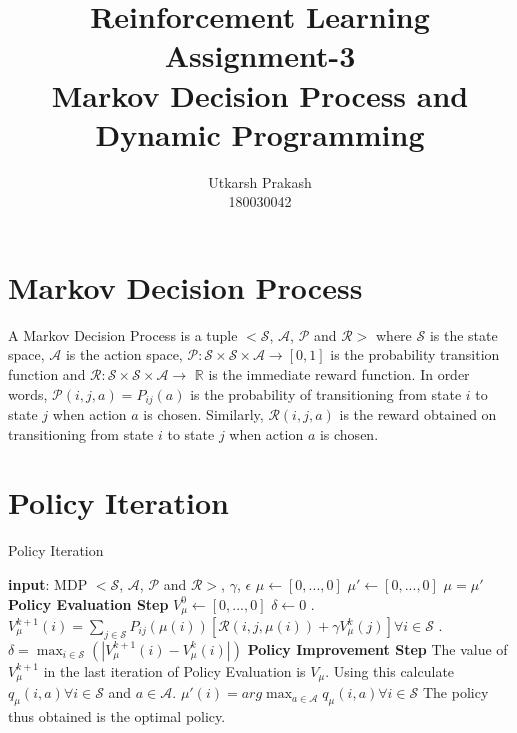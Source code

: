 \documentclass{article}
\title{Reinforcement Learning Assignment-3 \\
	\Large Markov Decision Process and Dynamic Programming \\}
\begin{document}
\author{Utkarsh Prakash \\ \normalsize 180030042}
\maketitle
\section{Markov Decision Process}
A Markov Decision Process is a tuple $<\mathcal{S}$, $\mathcal{A}$, $\mathcal{P}$ and $\mathcal{R}>$ where $\mathcal{S}$ is the state space,
$\mathcal{A}$ is the action space, $\mathcal{P} : \mathcal{S} \times \mathcal{S} \times \mathcal{A} \rightarrow [0, 1]$ is the probability transition
function and $\mathcal{R} : \mathcal{S} \times \mathcal{S} \times \mathcal{A} \rightarrow$ $\mathbb{R}$ is the immediate reward function.
In order words, $\mathcal{P}(i, j, a) = P_{ij}(a)$ is the probability of transitioning from state $i$ to state $j$ when action $a$ is chosen.
Similarly, $\mathcal{R}(i, j, a)$ is the reward obtained on transitioning from state $i$ to state $j$ when action $a$ is chosen.

\section{Policy Iteration}
    \begin{algorithm}
        \caption{Policy Iteration}\label{policy_iteration}
        \begin{algorithmic}
            \State \textbf{input}: MDP $<\mathcal{S}$, $\mathcal{A}$, $\mathcal{P}$ and $\mathcal{R}>$, $\gamma$, $\epsilon$
            \State $\mu \gets [0,..., 0]$ 
            \State $\mu' \gets [0,..., 0]$ 
                \State $\mu = \mu'$
                \State
                \State \textbf{Policy Evaluation Step}
                \State $V^{0}_{\mu} \gets [0,..., 0]$
                \While{$\delta >= \epsilon$}
                    \State $\delta \gets 0$
                    . $V^{k+1}_{\mu}(i) = \sum_{j \in \mathcal{S}} P_{ij}(\mu(i)) [\mathcal{R}(i, j, \mu(i)) + \gamma V^{k}_{\mu}(j)] \forall i \in \mathcal{S}$
                    . $\delta = \max_{i \in \mathcal{S}}(|V^{k+1}_{\mu}(i) - V^{k}_{\mu}(i)|)$
                \EndWhile
                \State 
                \State \textbf{Policy Improvement Step}
                \State The value of $V^{k+1}_{\mu}$ in the last iteration of Policy Evaluation is $V_{\mu}$. Using this calculate $q_{\mu}(i, a) \forall i \in \mathcal{S}$ and $a \in \mathcal{A}$.
                \State $\mu'(i) = arg \max_{a \in \mathcal{A}} q_{\mu}(i, a) \forall i \in \mathcal{S}$
            \EndWhile
            \State The policy thus obtained is the optimal policy.
        \end{algorithmic}
    \end{algorithm}
\end{document}
